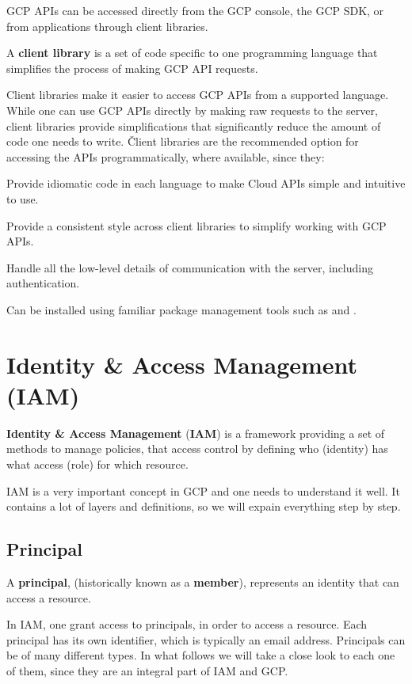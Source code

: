 GCP APIs can be accessed directly from the GCP console, the GCP SDK, or from applications through client libraries.

A \textbf{client library} is a set of code specific to one programming language that simplifies the process of making
GCP API requests.
\ed

Client libraries make it easier to access GCP APIs from a supported language. While one can use GCP APIs directly by
making raw requests to the server, client libraries provide simplifications that significantly reduce the amount of
code one needs to write. \v

Client libraries are the recommended option for accessing the APIs programmatically, where available, since they:
\bit
\item Provide idiomatic code in each language to make Cloud APIs simple and intuitive to use.
\item Provide a consistent style across client libraries to simplify working with GCP APIs.
\item Handle all the low-level details of communication with the server, including authentication.
\item Can be installed using familiar package management tools such as  and .
\eit

\section{Identity \& Access Management (IAM)}

\textbf{Identity \& Access Management} (\textbf{IAM}) is a framework providing a set of methods to manage policies,
that access control by defining who (identity) has what access (role) for which resource.
\ed

IAM is a very important concept in GCP and one needs to understand it well. It contains a lot of layers and definitions,
so we will expain everything step by step.

\subsection{Principal}

\bd[Principal]
A \textbf{principal}, (historically known as a \textbf{member}), represents an identity that can access a resource.
\ed

In IAM, one grant access to principals, in order to access a resource. Each principal has its own identifier, which is
typically an email address. Principals can be of many different types. In what follows we will take a close look to
each one of them, since they are an integral part of IAM and GCP\@.

